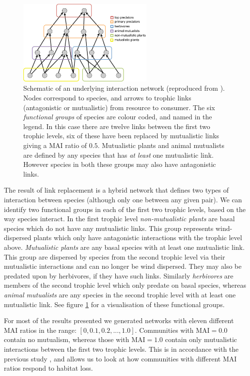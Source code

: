 \begin{figure}
	\centering
	\includegraphics[width=0.6\textwidth]{"diagrams/trophic_cartoon"}
	\caption{Schematic of an underlying interaction network (reproduced from \cite{lurgi2015effects}). Nodes correspond to species, and arrows to trophic links (antagonistic or mutualistic) from resource to consumer. The six \emph{functional groups} of species are colour coded, and named in the legend. In this case there are twelve links between the first two trophic levels, six of these have been replaced by mutualistic links giving a MAI ratio of $0.5$. Mutualistic plants and animal mutualists are defined by any species that has \emph{at least} one mutualistic link. However species in both these groups may also have antagonistic links.}
	\label{fig:trophic_cartoon}
\end{figure}

The result of link replacement is a hybrid network that defines two types of interaction between species (although only one between any given pair). We can identify two functional groups in each of the first two trophic levels, based on the way species interact. In the first trophic level \emph{non-mutualistic plants} are basal species which do not have any mutualistic links. This group represents wind-dispersed plants which only have antagonistic interactions with the trophic level above. \emph{Mutualistic plants} are any basal species with at least one mutualistic link. This group are dispersed by species from the second trophic level via their mutualistic interactions and can no longer be wind dispersed. They may also be predated upon by herbivores, if they have such links. Similarly \emph{herbivores} are members of the second trophic level which only predate on basal species, whereas \emph{animal mutualists} are any species in the second trophic level with at least one mutualistic link. See figure \ref{fig:trophic_cartoon} for a visualisation of these functional groups. 

For most of the results presented we generated networks with eleven different MAI ratios in the range: $[0,0.1,0.2,...,1.0]$. Communities with MAI$=0.0$ contain no mutualism, whereas those with MAI$=1.0$ contain only mutualistic interactions between the first two trophic levels. This is in accordance with the previous study \cite{lurgi2015effects}, and allows us to look at how communities with different MAI ratios respond to habitat loss. 


